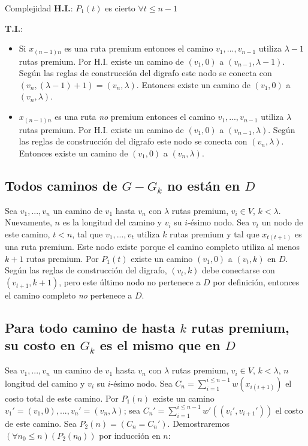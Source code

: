 \begin{subsection}{Complejidad}
\textbf{H.I.}: $P_1(t)$ es cierto $\forall t \leq n-1$

\textbf{T.I.}: 
\begin{itemize}

\item Si $x_{(n-1)n}$ es una ruta premium entonces el camino $v_1, ..., v_{n-1}$ utiliza $\lambda -1$ rutas premium. Por H.I. existe un camino de $(v_1, 0)$ a $(v_{n-1}, \lambda-1)$. Según las reglas de construcción del digrafo este nodo se conecta con $(v_{n}, (\lambda -1) + 1) = (v_{n}, \lambda)$. Entonces existe un camino de $(v_1, 0)$ a $(v_n, \lambda)$.

\item $x_{(n-1)n}$ es una ruta \textit{no} premium entonces el camino $v_1, ..., v_{n-1}$ utiliza $\lambda$ rutas premium. Por H.I. existe un camino de $(v_1, 0)$ a $(v_{n-1}, \lambda)$. Según las reglas de construcción del digrafo este nodo se conecta con $(v_{n}, \lambda)$. Entonces existe un camino de $(v_1, 0)$ a $(v_n, \lambda)$.

\end{itemize}

\subsection*{Todos caminos de $G - G_k$ no están en $D$}

Sea $v_1, ..., v_n$ un camino de $v_1$ hasta $v_n$ con $\lambda$ rutas premium, $v_i \in V$, $ k < \lambda$. Nuevamente, $n$ es la longitud del camino y $v_i$ su $i$-ésimo nodo. Sea $v_t$ un nodo de este camino, $t < n$, tal que $v_1, ..., v_t$ utiliza $k$ rutas premium y tal que $x_{t(t+1)}$ es una ruta premium. Este nodo existe porque el camino completo utiliza al menos $k+1$ rutas premium. Por $P_1(t)$ existe un camino $(v_1, 0)$ a $(v_t, k)$ en $D$. Según las reglas de construcción del digrafo, $(v_t, k)$ debe conectarse con $(v_{t+1}, k+1)$, pero este último nodo no pertenece a $D$ por definición, entonces el camino completo \textit{no} pertenece a $D$.

\subsection*{Para todo camino de hasta $k$ rutas premium, su costo en $G_k$ es el mismo que en $D$}

Sea $v_1, ..., v_n$ un camino de $v_1$ hasta $v_n$ con $\lambda$ rutas premium, $v_i \in V$, $ k < \lambda$, $n$ longitud del camino y $v_i$ su $i$-ésimo nodo. Sea $C_n = \sum_{i = 1}^{i \leq n-1} w(x_{i(i+1)})$ el costo total de este camino. Por $P_1(n)$ existe un camino $v_1' = (v_1, 0), ..., v_n' = (v_n, \lambda)$; sea $C_n' = \sum_{i = 1}^{i \leq n-1} w'((v_i', v_{i+1}'))$ el costo de este camino. Sea $P_2(n) = (C_n = C_n')$. Demostraremos $(\forall n_0 \leq n)(P_2(n_0))$ por inducción en $n$:


\end{subsection}
